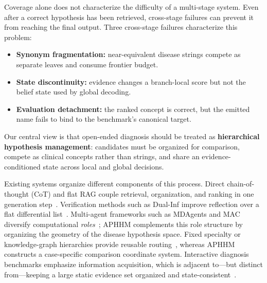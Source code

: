 \documentclass[letterpaper]{article} %
\begin{document}
Coverage alone does not characterize the difficulty of a multi-stage system. Even after a correct hypothesis has been retrieved, cross-stage failures can prevent it from reaching the final output.
Three cross-stage failures characterize this problem:
\begin{itemize}
  \item \textbf{Synonym fragmentation:} near-equivalent disease strings compete as separate leaves and consume frontier budget.
  \item \textbf{State discontinuity:} evidence changes a branch-local score but not the belief state used by global decoding.
  \item \textbf{Evaluation detachment:} the ranked concept is correct, but the emitted name fails to bind to the benchmark's canonical target.
\end{itemize}
Our central view is that open-ended diagnosis should be treated as \textbf{hierarchical hypothesis management}: candidates must be organized for comparison, compete as clinical concepts rather than strings, and share an evidence-conditioned state across local and global decisions.

Existing systems organize different components of this process.
Direct chain-of-thought (CoT) and flat RAG couple retrieval, organization, and ranking in one generation step~\cite{wei2022cot,medrag,imedrag}.
Verification methods such as Dual-Inf improve reflection over a flat differential list~\cite{dualinf2025}.
Multi-agent frameworks such as MDAgents and MAC diversify computational \emph{roles}~\cite{mdagents,chen2025mac,mac2026}; APHHM complements this role structure by organizing the geometry of the disease hypothesis space.
Fixed specialty or knowledge-graph hierarchies provide reusable routing~\cite{kg4diagnosis}, whereas APHHM constructs a case-specific comparison coordinate system.
Interactive diagnosis benchmarks emphasize information acquisition, which is adjacent to---but distinct from---keeping a large static evidence set organized and state-consistent~\cite{sdbench2025,meddxagent2025}.
\end{document}
